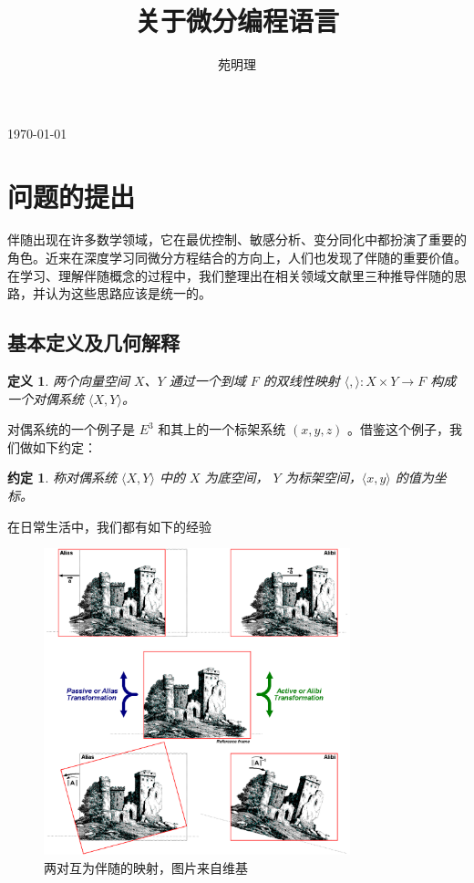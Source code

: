 \documentclass[a4paper,12pt]{article}
\title{关于微分编程语言}
\author{苑明理}
\date{}
\newtheorem{definition}{定义}
\newtheorem{convention}{约定}
\begin{document}

\maketitle{}

\begin{center}
  {\sihao \monthyeardate\today}\\[1ex]
\end{center}

\renewcommand\contentsname{目录}
\setcounter{tocdepth}{2}
\tableofcontents

\newpage

\section{问题的提出}

伴随出现在许多数学领域，它在最优控制、敏感分析、变分同化中都扮演了重要的角色。近来在深度学习同微分方程结合的方向上，人们也发现了伴随的重要价值。
在学习、理解伴随概念的过程中，我们整理出在相关领域文献里三种推导伴随的思路，并认为这些思路应该是统一的。

\subsection{基本定义及几何解释}

\begin{definition}
\label{d0}
两个向量空间 $X$、$Y$ 通过一个到域 $ F $ 的双线性映射 $ \langle , \rangle : X \times Y \to F $ 构成一个对偶系统 $ \langle X, Y \rangle $。
\end{definition}

对偶系统的一个例子是 $ E^3 $ 和其上的一个标架系统 $ (x, y, z) $ 。借鉴这个例子，我们做如下约定：

\begin{convention}
称对偶系统 $ \langle X, Y \rangle $ 中的 $ X $ 为底空间， $ Y $ 为标架空间，$ \langle x, y \rangle $ 的值为坐标。
\end{convention}

在日常生活中，我们都有如下的经验

\begin{figure}[ht]
\centering
\includegraphics[width=3.5in]{images/adjoint/alias_and_alibi.png}
\caption{两对互为伴随的映射，图片来自维基}
\end{figure}
\end{document}
